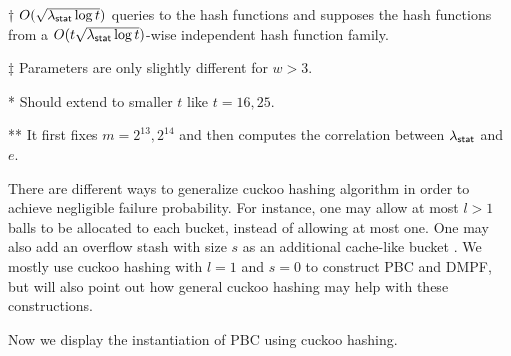 \begin{table*}
\begin{threeparttable}
\begin{tabular}{cccccc}
      \bottomrule
    \end{tabular}	
    \begin{tablenotes}
      \item [$\dag$] $O(\sqrt{\lambda_{\sf stat} \log t})$ queries to the hash functions and supposes the hash functions from a $O(t\sqrt{\lambda_{\sf stat} \log t})$-wise independent hash function family. 
      \item [$\ddag$] Parameters are only slightly different for $w>3$. 
      \item [*] Should extend to smaller $t$ like $t = 16, 25$.
      \item [**]It first fixes $m = 2^{13}, 2^{14}$ and then computes the correlation between $\lambda_{\sf stat}$ and $e$.   
      \end{tablenotes}
  \end{threeparttable}
\end{table*}

There are different ways to generalize cuckoo hashing algorithm in order to achieve negligible failure probability. For instance, one may allow at most $l>1$ balls to be allocated to each bucket, instead of allowing at most one. One may also add an overflow stash with size $s$ as an additional cache-like bucket \cite{KMW10}. We mostly use cuckoo hashing with $l=1$ and $s=0$ to construct PBC and DMPF, but will also point out how general cuckoo hashing may help with these constructions. 

Now we display the instantiation of PBC using cuckoo hashing. 

